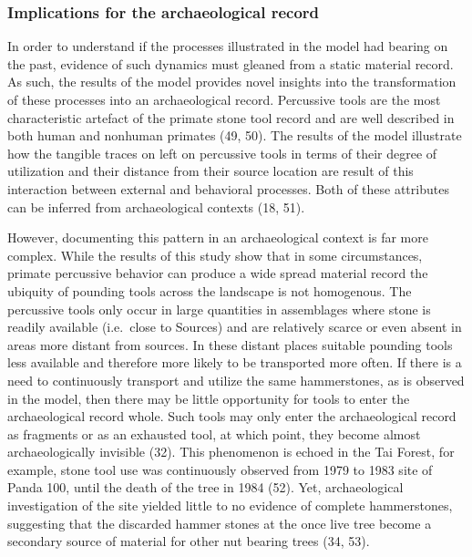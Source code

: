 \documentclass[9pt,twocolumn,twoside,]{pnas-new}
\begin{document}
\hypertarget{implications-for-the-archaeological-record}{%
\subsubsection{Implications for the archaeological
record}\label{implications-for-the-archaeological-record}}

In order to understand if the processes illustrated in the model had
bearing on the past, evidence of such dynamics must gleaned from a
static material record. As such, the results of the model provides novel
insights into the transformation of these processes into an
archaeological record. Percussive tools are the most characteristic
artefact of the primate stone tool record and are well described in both
human and nonhuman primates (49, 50). The results of the model
illustrate how the tangible traces on left on percussive tools in terms
of their degree of utilization and their distance from their source
location are result of this interaction between external and behavioral
processes. Both of these attributes can be inferred from archaeological
contexts (18, 51).

However, documenting this pattern in an archaeological context is far
more complex. While the results of this study show that in some
circumstances, primate percussive behavior can produce a wide spread
material record the ubiquity of pounding tools across the landscape is
not homogenous. The percussive tools only occur in large quantities in
assemblages where stone is readily available (i.e.~close to Sources) and
are relatively scarce or even absent in areas more distant from sources.
In these distant places suitable pounding tools less available and
therefore more likely to be transported more often. If there is a need
to continuously transport and utilize the same hammerstones, as is
observed in the model, then there may be little opportunity for tools to
enter the archaeological record whole. Such tools may only enter the
archaeological record as fragments or as an exhausted tool, at which
point, they become almost archaeologically invisible (32). This
phenomenon is echoed in the Tai Forest, for example, stone tool use was
continuously observed from 1979 to 1983 site of Panda 100, until the
death of the tree in 1984 (52). Yet, archaeological investigation of the
site yielded little to no evidence of complete hammerstones, suggesting
that the discarded hammer stones at the once live tree become a
secondary source of material for other nut bearing trees (34, 53).
\end{document}
